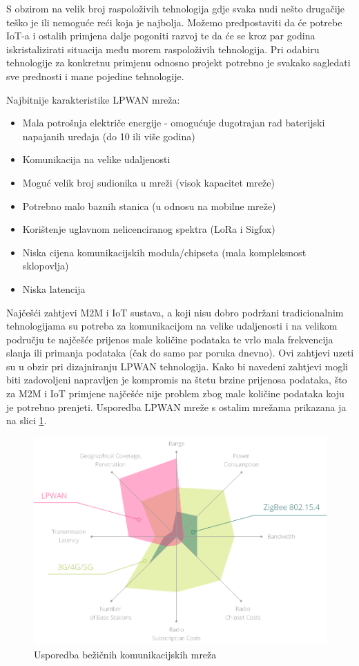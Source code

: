 \pagebreak
S obzirom na velik broj raspoloživih tehnologija gdje svaka nudi nešto drugačije teško je ili nemoguće reći koja je najbolja. Možemo predpostaviti da će potrebe IoT-a i ostalih primjena dalje pogoniti razvoj te da će se kroz par godina iskristalizirati situacija među morem raspoloživih tehnologija.
Pri odabiru tehnologije za konkretnu primjenu odnosno projekt potrebno je svakako sagledati sve prednosti i mane pojedine tehnologije.
\newline

Najbitnije karakteristike LPWAN mreža:
\begin{itemize}
\item Mala potrošnja električe energije - omogućuje dugotrajan rad baterijski napajanih uređaja (do 10 ili više godina)
\item Komunikacija na velike udaljenosti
\item Moguć velik broj sudionika u mreži (visok kapacitet mreže)
\item Potrebno malo baznih stanica (u odnosu na mobilne mreže)
\item Korištenje uglavnom nelicenciranog spektra (LoRa i Sigfox)
\item Niska cijena komunikacijskih modula/chipseta (mala kompleksnost sklopovlja)
\item Niska latencija
\end{itemize}

\vspace{5mm}
Najčešći zahtjevi M2M i IoT sustava, a koji nisu dobro podržani tradicionalnim tehnologijama su potreba za komunikacijom na velike udaljenosti i na velikom području te najčešće prijenos male količine podataka te vrlo mala frekvencija slanja ili primanja podataka (čak do samo par poruka dnevno).
Ovi zahtjevi uzeti su u obzir pri dizajniranju LPWAN tehnologija. Kako bi navedeni zahtjevi mogli biti zadovoljeni napravljen je kompromis na štetu brzine prijenosa podataka, što za M2M i IoT primjene najčešće nije problem zbog male količine podataka koju je potrebno prenjeti.
Usporedba LPWAN mreže s ostalim mrežama prikazana ja na slici \ref{img:comparison}.
\begin{figure}[ht!]
\centering
\includegraphics[width=1.0\textwidth]{images/lpwan_other_comparison.png}
\caption{Usporedba bežičnih komunikacijskih mreža}
\label{img:comparison}
\end{figure}

